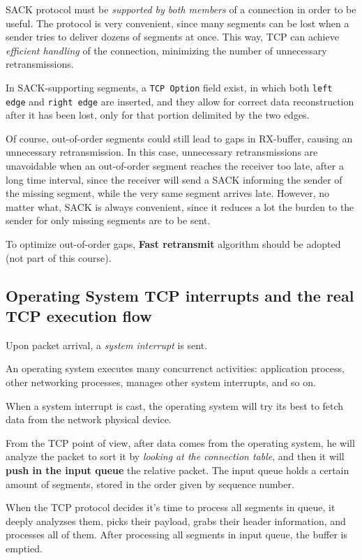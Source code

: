 \documentclass[10pt]{extbook}
\begin{document}
SACK protocol must be \emph{supported by both members} of a connection in order
to be useful. The protocol is very convenient, since many segments can be lost
when a sender tries to deliver dozens of segments at once. This way, TCP can
achieve \emph{efficient handling} of the connection, minimizing the number of
unnecessary retransmissions.

In SACK\--supporting segments, a \texttt{TCP Option} field exist, in which both
\texttt{left edge} and \texttt{right edge} are inserted, and they allow for
correct data reconstruction after it has been lost, only for that portion
delimited by the two edges.

Of course, out-of-order segments could still lead to gaps in RX-buffer, causing
an unnecessary retransmission. In this case, unnecessary retransmissions are
unavoidable when an out-of-order segment reaches the receiver too late, after a
long time interval, since the receiver will send a SACK informing the sender of
the missing segment, while the very same segment arrives late. However, no
matter what, SACK is always convenient, since it reduces a lot the burden to
the sender for only missing segments are to be sent.

To optimize out-of-order gaps, \textbf{Fast retransmit} algorithm should be
adopted (not part of this course).

\subsection{Operating System TCP interrupts and the real TCP execution flow}

Upon packet arrival, a \emph{system interrupt} is sent. 

An operating system executes many concurrenct activities: application process, other networking processes, manages other system interrupts, and so on.

When a system interrupt is cast, the operating system will try its best to fetch data from the network physical device.

From the TCP point of view, after data comes from the operating system, he will
analyze the packet to sort it by \emph{looking at the connection table}, and
then it will \textbf{push in the input queue} the relative packet. The input
queue holds a certain amount of segments, stored in the order given by sequence
number.

When the TCP protocol decides it's time to process all segments in queue, it
deeply analyzses them, picks their payload, grabs their header information, and
processes all of them. After processing all segments in input queue, the buffer
is emptied.
\end{document}
